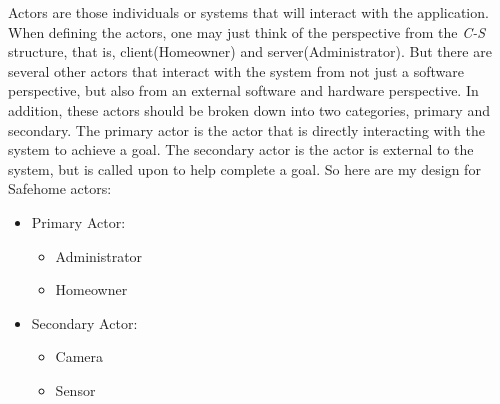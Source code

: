 \documentclass[twoside,11pt]{article}
\begin{document}
Actors are those individuals or systems that will interact with the application\cite{Lance2018Creating}. When defining the actors, one may just think of the perspective from the \emph{C-S} structure, that is, client(Homeowner) and server(Administrator). But there are several other actors that interact with the system from not just a software perspective, but also from an external software and hardware perspective. In addition, these actors should be broken down into two categories, primary and secondary. The primary actor is the actor that is directly interacting with the system to achieve a goal. The secondary actor is the actor is external to the system, but is called upon to help complete a goal. So here are my design for Safehome actors:
\begin{itemize}
    \item Primary Actor:
          \begin{itemize}
              \item Administrator
              \item Homeowner
          \end{itemize}

    \item Secondary Actor:
          \begin{itemize}
              \item Camera
              \item Sensor
          \end{itemize}
\end{itemize}
\end{document}
